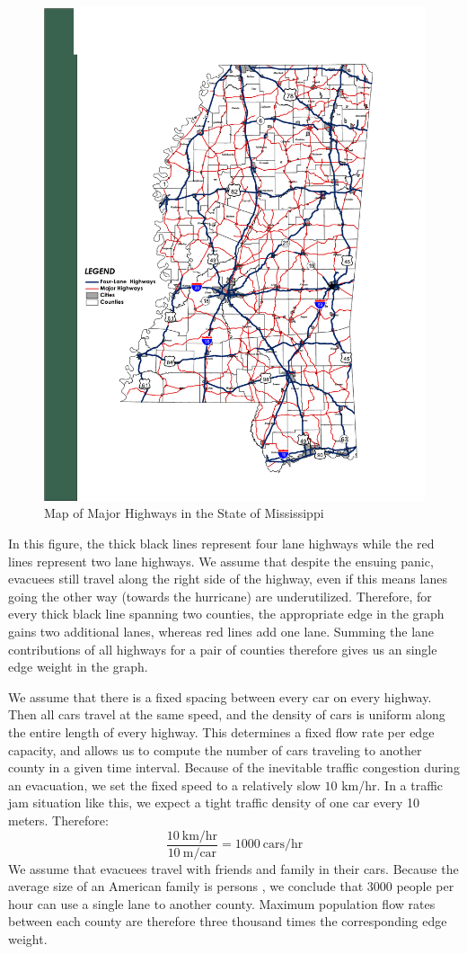\documentclass[titlepage]{article}
\begin{document}
  \begin{figure}[H]
  \centering
  \includegraphics[width=.5\textwidth]{ms_highways.pdf}
  \caption{Map of Major Highways in the State of Mississippi \cite{ms_highways}}
  \label{fig:highway_map}
  \end{figure}
  \par
    In this figure, the thick black lines represent four lane highways while the red lines represent two lane highways. We assume that despite the ensuing panic, evacuees still travel along the right side of the highway, even if this means lanes going the other way (towards the hurricane) are underutilized. Therefore, for every thick black line spanning two counties, the appropriate edge in the graph gains two additional lanes, whereas red lines add one lane. Summing the lane contributions of all highways for a pair of counties therefore gives us an single edge weight in the graph.
  \newline
  \par
    We assume that there is a fixed spacing between every car on every highway. Then all cars travel at the same speed, and the density of cars is uniform along the entire length of every highway. This determines a fixed flow rate per edge capacity, and allows us to compute the number of cars traveling to another county in a given time interval. Because of the inevitable traffic congestion during an evacuation, we set the fixed speed to a relatively slow $10$ km/hr. In a traffic jam situation like this, we expect a tight traffic density of one car every 10 meters. Therefore:
    \[
      \frac{10\ \text{km/hr}}{10\ \text{m/car}} = 1000\ \text{cars/hr}
    \]
    We assume that evacuees travel with friends and family in their cars. Because the average size of an American family is  persons \cite{famsize}, we conclude that 3000 people per hour can use a single lane to another county. Maximum population flow rates between each county are therefore three thousand times the corresponding edge weight.
\end{document}
